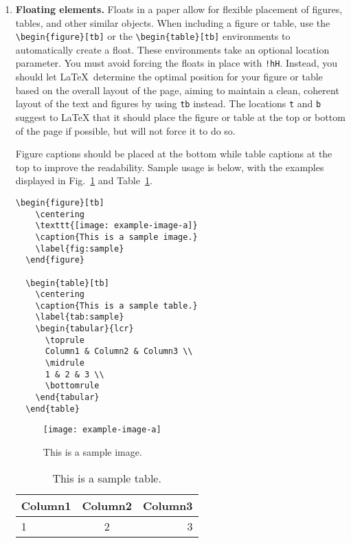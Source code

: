 \documentclass[fullpaper]{nldl}
\begin{document}
\begin{enumerate}[leftmargin=*]

\item \textbf{Floating elements.}
Floats in a paper allow for flexible placement of figures, tables, and other similar objects.
When including a figure or table, use the \verb|\begin{figure}[tb]| or the \verb|\begin{table}[tb]| environments to automatically create a float.
These environments take an optional location parameter.
You must avoid forcing the floats in place with \verb|!hH|.
Instead, you should let \LaTeX\ determine the optimal position for your figure or table based on the overall layout of the page, aiming to maintain a clean, coherent layout of the text and figures by using \verb|tb| instead.
The locations \verb|t| and \verb|b| suggest to LaTeX that it should place the figure or table at the top or bottom of the page if possible, but will not force it to do so.

Figure captions should be placed at the bottom while table captions at the top to improve the readability.
Sample usage is below, with the examples displayed in Fig.~\ref{fig:sample} and Table~\ref{tab:sample}.
  \begin{lstlisting}[gobble=2]
  \begin{figure}[tb]
    \centering
    \texttt{[image: example-image-a]}
    \caption{This is a sample image.}
    \label{fig:sample}
  \end{figure}

  \begin{table}[tb]
    \centering
    \caption{This is a sample table.}
    \label{tab:sample}
    \begin{tabular}{lcr}
      \toprule
      Column1 & Column2 & Column3 \\
      \midrule
      1 & 2 & 3 \\
      \bottomrule
    \end{tabular}
  \end{table}
\end{lstlisting}

\begin{figure}[tb]
  \centering
  \texttt{[image: example-image-a]}
  \caption{This is a sample image.}
  \label{fig:sample}
\end{figure}

\begin{table}[tb]
  \centering
  \caption{This is a sample table.}
  \label{tab:sample}
  \begin{tabular}{lcr}
    \toprule
    Column1 & Column2 & Column3 \\
    \midrule
    1 & 2 & 3 \\
    \bottomrule
  \end{tabular}
\end{table}


\end{enumerate}
\end{document}
